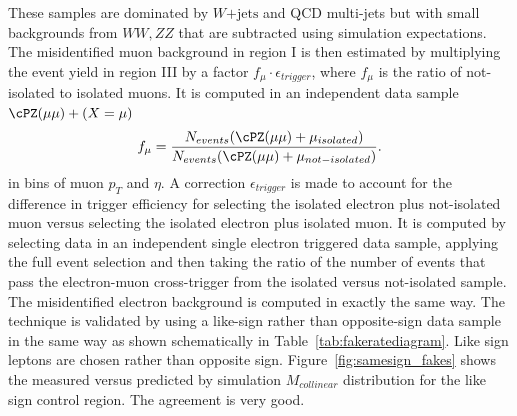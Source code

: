 These samples are dominated by $W\mathrm{+jets}$ and QCD multi-jets but with small backgrounds from $WW,ZZ$  that are subtracted using
simulation expectations. The misidentified  muon background in region I is then estimated by multiplying the event yield in region III by a
factor $f_{\mu}\cdot\epsilon_{trigger}$, where $f_{\mu}$ is the ratio
of not-isolated to isolated muons. It is computed in an independent data sample $\cPZ(\mu \mu) + (X=\mu)$
\begin{equation*}
f_{\mu}=\frac{ N_{events}(\cPZ(\mu \mu) + \mu_{isolated}) }{N_{events}(\cPZ(\mu \mu) + \mu_{not-isolated}) }.
\end{equation*}
in bins of muon $p_{T}$ and $\eta$. A correction $\epsilon_{trigger}$ is made to
account for the difference in trigger efficiency for selecting the isolated electron plus not-isolated
muon versus selecting the isolated electron plus isolated muon. It is computed by selecting data
in an independent single electron triggered data sample, applying the full event selection and then taking the
ratio of the number of events that pass the electron-muon cross-trigger from the isolated versus
not-isolated sample. The misidentified electron background is computed in exactly the same way.
The technique is validated by using a like-sign rather than opposite-sign data sample in
the same way as shown schematically  in Table~\ref{tab:fakeratediagram}. Like sign leptons are chosen rather than opposite sign.
Figure~\ref{fig:samesign_fakes} shows the measured  versus predicted by simulation $M_{collinear}$ distribution for the like sign control region. The agreement is very good.




